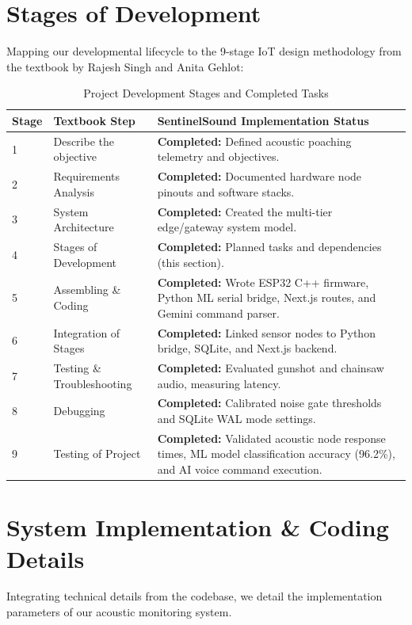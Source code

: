 \documentclass[11pt,a4paper]{article}
\begin{document}
\section{Stages of Development}
Mapping our developmental lifecycle to the 9-stage IoT design methodology from the textbook by Rajesh Singh and Anita Gehlot:

\begin{table}[H]
    \centering
    \caption{Project Development Stages and Completed Tasks}
    \small
    \begin{tabular}{lp{6.2cm}p{7.8cm}}
        \toprule
        \textbf{Stage} & \textbf{Textbook Step} & \textbf{SentinelSound Implementation Status} \\
        \midrule
        1 & Describe the objective & \textbf{Completed:} Defined acoustic poaching telemetry and objectives. \\
        2 & Requirements Analysis & \textbf{Completed:} Documented hardware node pinouts and software stacks. \\
        3 & System Architecture & \textbf{Completed:} Created the multi-tier edge/gateway system model. \\
        4 & Stages of Development & \textbf{Completed:} Planned tasks and dependencies (this section). \\
        5 & Assembling \& Coding & \textbf{Completed:} Wrote ESP32 C++ firmware, Python ML serial bridge, Next.js routes, and Gemini command parser. \\
        6 & Integration of Stages & \textbf{Completed:} Linked sensor nodes to Python bridge, SQLite, and Next.js backend. \\
        7 & Testing \& Troubleshooting & \textbf{Completed:} Evaluated gunshot and chainsaw audio, measuring latency. \\
        8 & Debugging & \textbf{Completed:} Calibrated noise gate thresholds and SQLite WAL mode settings. \\
        9 & Testing of Project & \textbf{Completed:} Validated acoustic node response times, ML model classification accuracy (96.2\%), and AI voice command execution. \\
        \bottomrule
    \end{tabular}
\end{table}

\section{System Implementation \& Coding Details}
Integrating technical details from the codebase, we detail the implementation parameters of our acoustic monitoring system.
\end{document}
